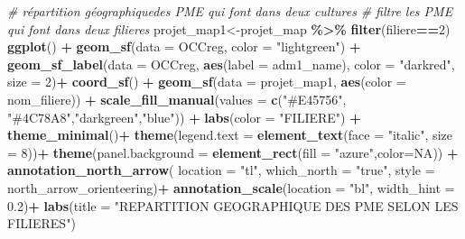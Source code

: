 \documentclass[
]{article}
\newenvironment{Shaded}{\begin{snugshade}}{\end{snugshade}}
\newcommand{\AttributeTok}[1]{\textcolor[rgb]{0.13,0.29,0.53}{#1}}
\newcommand{\CommentTok}[1]{\textcolor[rgb]{0.56,0.35,0.01}{\textit{#1}}}
\newcommand{\ConstantTok}[1]{\textcolor[rgb]{0.56,0.35,0.01}{#1}}
\newcommand{\DecValTok}[1]{\textcolor[rgb]{0.00,0.00,0.81}{#1}}
\newcommand{\FloatTok}[1]{\textcolor[rgb]{0.00,0.00,0.81}{#1}}
\newcommand{\FunctionTok}[1]{\textcolor[rgb]{0.13,0.29,0.53}{\textbf{#1}}}
\newcommand{\NormalTok}[1]{#1}
\newcommand{\OtherTok}[1]{\textcolor[rgb]{0.56,0.35,0.01}{#1}}
\newcommand{\SpecialCharTok}[1]{\textcolor[rgb]{0.81,0.36,0.00}{\textbf{#1}}}
\newcommand{\StringTok}[1]{\textcolor[rgb]{0.31,0.60,0.02}{#1}}
\begin{document}
\begin{Shaded}
\begin{Highlighting}[]
\CommentTok{\# répartition géographiquedes PME qui font dans deux  cultures}
 \CommentTok{\# filtre les PME qui font dans deux filieres}
\NormalTok{projet\_map1}\OtherTok{\textless{}{-}}\NormalTok{projet\_map }\SpecialCharTok{\%\textgreater{}\%} \FunctionTok{filter}\NormalTok{(filiere}\SpecialCharTok{==}\DecValTok{2}\NormalTok{)}
\FunctionTok{ggplot}\NormalTok{() }\SpecialCharTok{+}
  \FunctionTok{geom\_sf}\NormalTok{(}\AttributeTok{data =}\NormalTok{ OCCreg, }\AttributeTok{color =} \StringTok{"lightgreen"}\NormalTok{) }\SpecialCharTok{+} 
  \FunctionTok{geom\_sf\_label}\NormalTok{(}\AttributeTok{data =}\NormalTok{ OCCreg, }
                \FunctionTok{aes}\NormalTok{(}\AttributeTok{label =}\NormalTok{ adm1\_name), }\AttributeTok{color =} \StringTok{"darkred"}\NormalTok{, }\AttributeTok{size =} \DecValTok{2}\NormalTok{)}\SpecialCharTok{+}
  \FunctionTok{coord\_sf}\NormalTok{() }\SpecialCharTok{+}
  \FunctionTok{geom\_sf}\NormalTok{(}\AttributeTok{data =}\NormalTok{ projet\_map1, }\FunctionTok{aes}\NormalTok{(}\AttributeTok{color =}\NormalTok{ nom\_filiere)) }\SpecialCharTok{+}
  \FunctionTok{scale\_fill\_manual}\NormalTok{(}\AttributeTok{values =} \FunctionTok{c}\NormalTok{(}\StringTok{"\#E45756"}\NormalTok{, }\StringTok{"\#4C78A8"}\NormalTok{,}\StringTok{"darkgreen"}\NormalTok{,}\StringTok{"blue"}\NormalTok{)) }\SpecialCharTok{+}  
  \FunctionTok{labs}\NormalTok{(}\AttributeTok{color =} \StringTok{"FILIERE"}\NormalTok{) }\SpecialCharTok{+}
  \FunctionTok{theme\_minimal}\NormalTok{()}\SpecialCharTok{+}
  \FunctionTok{theme}\NormalTok{(}\AttributeTok{legend.text =} \FunctionTok{element\_text}\NormalTok{(}\AttributeTok{face =} \StringTok{"italic"}\NormalTok{, }\AttributeTok{size =} \DecValTok{8}\NormalTok{))}\SpecialCharTok{+}
  \FunctionTok{theme}\NormalTok{(}\AttributeTok{panel.background =} \FunctionTok{element\_rect}\NormalTok{(}\AttributeTok{fill =} \StringTok{"azure"}\NormalTok{,}\AttributeTok{color=}\ConstantTok{NA}\NormalTok{)) }\SpecialCharTok{+}
  \FunctionTok{annotation\_north\_arrow}\NormalTok{(}
    \AttributeTok{location =} \StringTok{"tl"}\NormalTok{, }\AttributeTok{which\_north =} \StringTok{"true"}\NormalTok{, }\AttributeTok{style =}\NormalTok{ north\_arrow\_orienteering)}\SpecialCharTok{+}
  \FunctionTok{annotation\_scale}\NormalTok{(}\AttributeTok{location =} \StringTok{"bl"}\NormalTok{, }\AttributeTok{width\_hint =} \FloatTok{0.2}\NormalTok{)}\SpecialCharTok{+}
  \FunctionTok{labs}\NormalTok{(}\AttributeTok{title =} \StringTok{"REPARTITION GEOGRAPHIQUE DES PME SELON LES FILIERES"}\NormalTok{)}
\end{Highlighting}
\end{Shaded}
\end{document}
